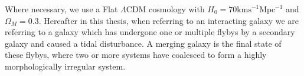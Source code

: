 Where necessary, we use a Flat $\Lambda$CDM cosmology with $H_{0} = 70\mathrm{kms}^{-1}\mathrm{Mpc}^{-1}$ and $\Omega_{M} = 0.3$. Hereafter in this thesis, when referring to an interacting galaxy we are referring to a galaxy which has undergone one or multiple flybys by a secondary galaxy and caused a tidal disturbance. A merging galaxy is the final state of these flybys, where two or more systems have coalesced to form a highly morphologically irregular system.
